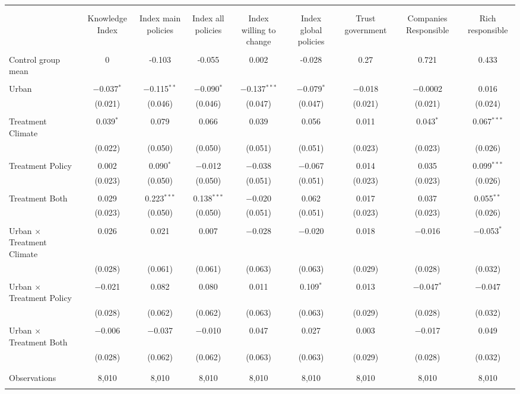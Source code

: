 
\begin{tabular}{@{\extracolsep{5pt}}lcccccccc} 
\\[-1.8ex]\hline 
\hline \\[-1.8ex] 
\\[-1.8ex] & Knowledge Index & Index main policies & Index all policies & Index willing to change & Index global policies & Trust government & Companies Responsible & Rich responsible \\ 
\hline \\[-1.8ex] 
 Control group mean & 0 & -0.103 & -0.055 & 0.002 & -0.028 & 0.27 & 0.721 & 0.433  \\ \hline \\[-1.8ex] Urban & $-$0.037$^{*}$ & $-$0.115$^{**}$ & $-$0.090$^{*}$ & $-$0.137$^{***}$ & $-$0.079$^{*}$ & $-$0.018 & $-$0.0002 & 0.016 \\ 
  & (0.021) & (0.046) & (0.046) & (0.047) & (0.047) & (0.021) & (0.021) & (0.024) \\ 
  & & & & & & & & \\ 
 Treatment Climate & 0.039$^{*}$ & 0.079 & 0.066 & 0.039 & 0.056 & 0.011 & 0.043$^{*}$ & 0.067$^{***}$ \\ 
  & (0.022) & (0.050) & (0.050) & (0.051) & (0.051) & (0.023) & (0.023) & (0.026) \\ 
  & & & & & & & & \\ 
 Treatment Policy & 0.002 & 0.090$^{*}$ & $-$0.012 & $-$0.038 & $-$0.067 & 0.014 & 0.035 & 0.099$^{***}$ \\ 
  & (0.023) & (0.050) & (0.050) & (0.051) & (0.051) & (0.023) & (0.023) & (0.026) \\ 
  & & & & & & & & \\ 
 Treatment Both & 0.029 & 0.223$^{***}$ & 0.138$^{***}$ & $-$0.020 & 0.062 & 0.017 & 0.037 & 0.055$^{**}$ \\ 
  & (0.023) & (0.050) & (0.050) & (0.051) & (0.051) & (0.023) & (0.023) & (0.026) \\ 
  & & & & & & & & \\ 
 Urban $\times$ Treatment Climate & 0.026 & 0.021 & 0.007 & $-$0.028 & $-$0.020 & 0.018 & $-$0.016 & $-$0.053$^{*}$ \\ 
  & (0.028) & (0.061) & (0.061) & (0.063) & (0.063) & (0.029) & (0.028) & (0.032) \\ 
  & & & & & & & & \\ 
 Urban $\times$ Treatment Policy & $-$0.021 & 0.082 & 0.080 & 0.011 & 0.109$^{*}$ & 0.013 & $-$0.047$^{*}$ & $-$0.047 \\ 
  & (0.028) & (0.062) & (0.062) & (0.063) & (0.063) & (0.029) & (0.028) & (0.032) \\ 
  & & & & & & & & \\ 
 Urban $\times$ Treatment Both & $-$0.006 & $-$0.037 & $-$0.010 & 0.047 & 0.027 & 0.003 & $-$0.017 & 0.049 \\ 
  & (0.028) & (0.062) & (0.062) & (0.063) & (0.063) & (0.029) & (0.028) & (0.032) \\ 
  & & & & & & & & \\ 
\hline \\[-1.8ex] 

Observations & 8,010 & 8,010 & 8,010 & 8,010 & 8,010 & 8,010 & 8,010 & 8,010 \\ 
\hline 
\hline \\[-1.8ex] 
\end{tabular} 
